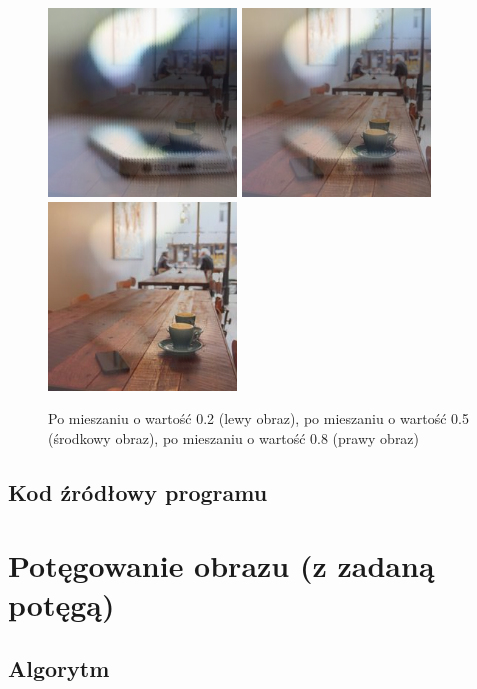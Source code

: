 \documentclass[a4paper,12pt]{book}
\begin{document}
\begin{figure}[H]
	\caption{Po mieszaniu o wartość 0.2 (lewy obraz), po mieszaniu o wartość 0.5 (środkowy obraz), po mieszaniu o wartość 0.8 (prawy obraz)}
	\includegraphics[width=5cm, height=5cm]{3-3/blend-color-images-coffee-2.png}
	\includegraphics[width=5cm, height=5cm]{3-3/blend-color-images-coffee-5.png}
	\includegraphics[width=5cm, height=5cm]{3-3/blend-color-images-coffee-8.png}
\end{figure}

\subsection*{Kod źródłowy programu}

\section{Potęgowanie obrazu (z zadaną potęgą)}
\subsection*{Algorytm}
\end{document}
